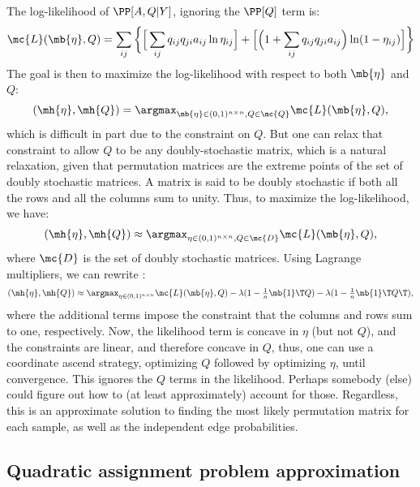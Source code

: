 The log-likelihood of $\PP[A,Q|Y]$, ignoring the $\PP[Q]$ term is:
\begin{align}
	\mc{L}(\mb{\eta},Q)  = \sum_{ij} \bigg\{\Big[\sum_{ij} q_{ij} q_{ji} a_{ij} \ln \eta_{ij}\Big] + \Big[ \Big(1+\sum_{ij} q_{ij} q_{ji} a_{ij}\Big) \ln (1-\eta_{ij})\Big]\bigg\}
\end{align}
The goal is then to maximize the log-likelihood with respect to both $\mb{\eta}$ and $Q$:
\begin{align}
	(\mh{\eta},\mh{Q}) = \argmax_{\mb{\eta} \in (0,1)^{n\times n} ,Q \in \mc{Q}} \mc{L}(\mb{\eta},Q),
\end{align}
which is difficult in part due to the constraint on $Q$.  But one can relax that constraint to allow $Q$ to be any doubly-stochastic matrix, which is a natural relaxation, given that permutation matrices are the extreme points of the set of doubly stochastic matrices.  A matrix is said to be doubly stochastic if both all the rows and all the columns sum to unity.  Thus, to maximize the log-likelihood, we have:
\begin{align}
	(\mh{\eta},\mh{Q}) \approx \argmax_{\eta \in  (0,1)^{n\times n}, Q \in \mc{D}} \mc{L}(\mb{\eta},Q),
\end{align}
where $\mc{D}$ is the set of doubly stochastic matrices.  Using Lagrange multipliers, we can rewrite \label{eq:mle}:
\begin{align}
	(\mh{\eta},\mh{Q}) \approx \argmax_{\eta \in  (0,1)^{n\times n}} \mc{L}(\mb{\eta},Q) - \lambda (1 - \tfrac{1}{n}\mb{1}\T Q) - \lambda (1 - \tfrac{1}{n}\mb{1}\T Q\T),
\end{align}
where the additional terms impose the constraint that the columns and rows sum to one, respectively.  Now, the likelihood term is concave in $\eta$ (but not $Q$), and the constraints are linear, and therefore concave in $Q$, thus, one can use a coordinate ascend strategy, optimizing $Q$ followed by optimizing $\eta$, until convergence. This ignores the $Q$ terms in the likelihood.  Perhaps somebody (else) could figure out how to (at least approximately) account for those.  Regardless, this is an approximate solution to finding the most likely permutation matrix for each sample, as well as the independent edge probabilities.   


\subsection{Quadratic assignment problem approximation} %
\label{sub:graph_isomorphism_approach}


